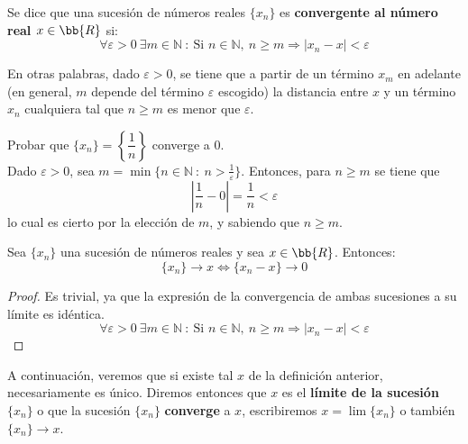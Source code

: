 \begin{definicion}
    Se dice que una sucesión de números reales  $\{x_n\}$ es \textbf{convergente al número real $x\in \bb{R}$} si:
    \begin{equation*}
        \forall \varepsilon > 0 ~\exists m \in \mathbb{N} ~:~ \text{Si $n \in \mathbb{N}$},~n \geq m \Longrightarrow \left| x_n - x \right| < \varepsilon
    \end{equation*}
\end{definicion}

En otras palabras, dado $\varepsilon > 0$, se tiene que a partir de un término $x_m$ en adelante (en general, $m$ depende del término
$\varepsilon$ escogido) la distancia entre $x$ y un término $x_n$ cualquiera tal que $n \geq m$ es menor que $\varepsilon$.

\begin{ejemplo}
    Probar que $\{x_n\}=\left\{\dfrac{1}{n}\right\}$ converge a 0. \\
    Dado $\varepsilon > 0$, sea $m = \min\{n \in \mathbb{N} ~:~ n > \frac{1}{\varepsilon}\}$.
    Entonces, para $n \geq m$ se tiene que
    \begin{equation*}
        |\frac{1}{n}-0| = \frac{1}{n} < \varepsilon
    \end{equation*}
    lo cual es cierto por la elección de $m$, y sabiendo que $n\geq m$.\\
\end{ejemplo}

\begin{lema}\label{lema:5.1.3}
    Sea $\{x_n\}$ una sucesión de números reales y sea $x\in \bb{R}$. Entonces:
    $$\{x_n\} \longrightarrow  x \Longleftrightarrow \{x_n - x\} \longrightarrow 0$$
\end{lema}
\begin{proof}
    Es trivial, ya que la expresión de la convergencia de ambas sucesiones a su límite es idéntica.
    \begin{equation*}
        \forall \varepsilon > 0 ~\exists m \in \mathbb{N} ~:~ \text{Si $n \in \mathbb{N}$},~n \geq m \Longrightarrow \left| x_n - x\right| < \varepsilon
    \end{equation*}
\end{proof}

A continuación, veremos que si existe tal $x$ de la definición anterior, necesariamente es único. Diremos entonces que
$x$ es el \textbf{límite de la sucesión $\{x_n\}$} o que la sucesión $\{x_n\}$ \textbf{converge}
a $x$, escribiremos $x= \lim \{x_n\}$ o también $\{x_n\}\longrightarrow x$.

